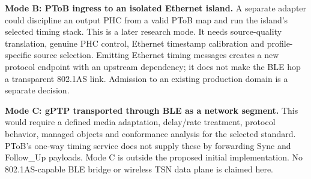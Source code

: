 \documentclass[11pt,letterpaper]{article}
\begin{document}
\textbf{Mode B: PToB ingress to an isolated Ethernet island.} A separate adapter could discipline an output PHC from a valid PToB map and run the island's selected timing stack. This is a later research mode. It needs source-quality translation, genuine PHC control, Ethernet timestamp calibration and profile-specific source selection. Emitting Ethernet timing messages creates a new protocol endpoint with an upstream dependency; it does not make the BLE hop a transparent 802.1AS link. Admission to an existing production domain is a separate decision.

\textbf{Mode C: gPTP transported through BLE as a network segment.} This would require a defined media adaptation, delay/rate treatment, protocol behavior, managed objects and conformance analysis for the selected standard. PToB's one-way timing service does not supply these by forwarding Sync and Follow\_Up payloads. Mode C is outside the proposed initial implementation. No 802.1AS-capable BLE bridge or wireless TSN data plane is claimed here.
\end{document}
